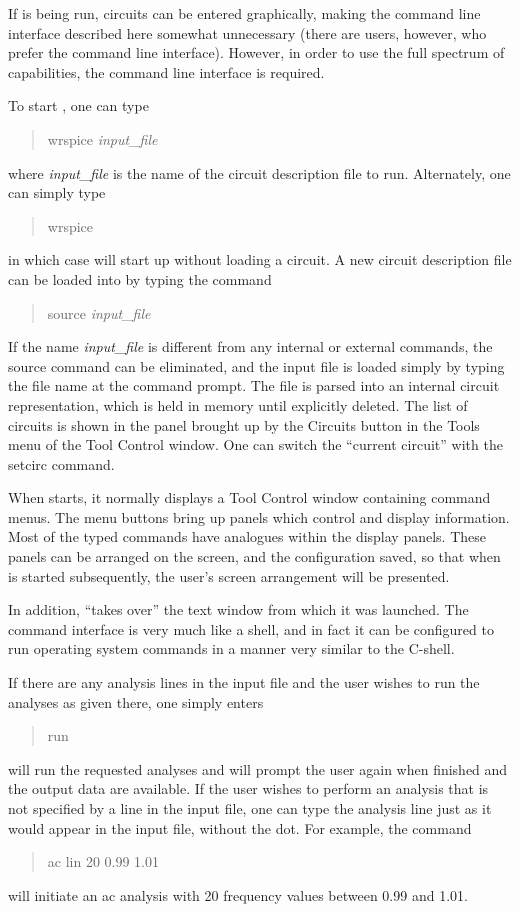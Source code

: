 If {\Xic} is being run, circuits can be entered graphically, making
the command line interface described here somewhat unnecessary (there
are users, however, who prefer the command line interface).  However,
in order to use the full spectrum of capabilities, the command line
interface is required.

To start {\WRspice}, one can type
\begin{quote}\vt
wrspice {\it input\_file}
\end{quote}
where {\it input\_file} is the name of the {\WRspice} circuit description
file to run.  Alternately, one can simply type
\begin{quote}\vt
wrspice
\end{quote}
in which case {\WRspice} will start up without loading a circuit.  A new
circuit description file can be loaded into {\WRspice} by typing the
command
\begin{quote}\vt
source {\it input\_file}
\end{quote}
If the name {\it input\_file} is different from any internal or
external {\WRspice} commands, the {\cb source} command can be
eliminated, and the {\WRspice} input file is loaded simply by typing
the file name at the command prompt.  The file is parsed into an
internal circuit representation, which is held in memory until
explicitly deleted.  The list of circuits is shown in the panel
brought up by the {\cb Circuits} button in the {\cb Tools} menu of the
{\cb Tool Control} window.  One can switch the ``current circuit''
with the {\cb setcirc} command.

When {\WRspice} starts, it normally displays a {\cb Tool Control}
window containing command menus.  The menu buttons bring up panels
which control and display information.  Most of the typed commands
have analogues within the display panels.  These panels can be
arranged on the screen, and the configuration saved, so that when
{\WRspice} is started subsequently, the user's screen arrangement will
be presented.

In addition, {\WRspice} ``takes over'' the text window from which it
was launched.  The command interface is very much like a shell, and in
fact it can be configured to run operating system commands in a manner
very similar to the C-shell.

If there are any analysis lines in the input file and the user wishes
to run the analyses as given there, one simply enters
\begin{quote}\vt
run
\end{quote}
{\WRspice} will run the requested analyses and will prompt the user again
when finished and the output data are available.  If the user wishes
to perform an analysis that is not specified by a line in the input
file, one can type the analysis line just as it would appear in the input file,
without the dot.  For example, the command
\begin{quote}\vt
ac lin 20 0.99 1.01
\end{quote}
will initiate an ac analysis with 20 frequency values between 0.99 and 1.01.

